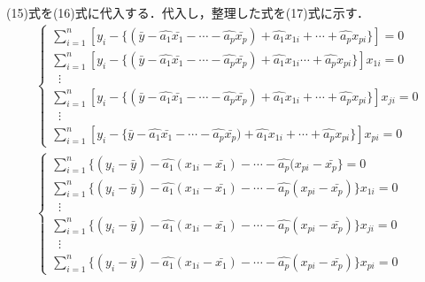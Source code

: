 \documentclass[dvipdfmx]{jsarticle}
\begin{document}
(15)式を(16)式に代入する．代入し，整理した式を(17)式に示す．
\begin{eqnarray}
  \begin{cases}
    \displaystyle
    \sum_{i=1}^n [y_i-\{(\bar{y}-\hat{a_1}\bar{x_1}-\cdots-\hat{a_p}\bar{x_p})+\hat{a_1}x_{1i}+\cdots+\hat{a_p}x_{pi}\}]=0       \\
    \displaystyle
    \sum_{i=1}^n [y_i-\{(\bar{y}-\hat{a_1}\bar{x_1}-\cdots-\hat{a_p}\bar{x_p})+\hat{a_1}x_{1i}\cdots+\hat{a_p}x_{pi}\}]x_{1i}=0  \\
    \; \; \vdots                                                                     \\
    \displaystyle
    \sum_{i=1}^n [y_i-\{(\bar{y}-\hat{a_1}\bar{x_1}-\cdots-\hat{a_p}\bar{x_p})+\hat{a_1}x_{1i}+\cdots+\hat{a_p}x_{pi}\}]x_{ji}=0 \\
    \; \; \vdots                                                                     \\
    \displaystyle
    \sum_{i=1}^n [y_i-\{\bar{y}-\hat{a_1}\bar{x_1}-\cdots-\hat{a_p}\bar{x_p})+\hat{a_1}x_{1i}+\cdots+\hat{a_p}x_{pi}\}]x_{pi}=0
  \end{cases}
  \nonumber
  \\
  \begin{cases}
    \displaystyle
    \sum_{i=1}^n \{ (y_i-\bar{y})-\hat{a_1}(x_{1i}-\bar{x_1})-\cdots-\hat{a_p}(x_{pi}-\bar{x_p}\}=0       \\
    \displaystyle
    \sum_{i=1}^n \{ (y_i-\bar{y})-\hat{a_1}(x_{1i}-\bar{x_1})-\cdots-\hat{a_p}(x_{pi}-\bar{x_p})\}x_{1i}=0 \\
    \; \; \vdots                                                                                           \\
    \displaystyle
    \sum_{i=1}^n \{ (y_i-\bar{y})-\hat{a_1}(x_{1i}-\bar{x_1})-\cdots-\hat{a_p}(x_{pi}-\bar{x_p})\}x_{ji}=0 \\
    \; \; \vdots                                                                                           \\
    \displaystyle
    \sum_{i=1}^n \{ (y_i-\bar{y})-\hat{a_1}(x_{1i}-\bar{x_1})-\cdots-\hat{a_p}(x_{pi}-\bar{x_p})\}x_{pi}=0
  \end{cases}
\end{eqnarray}
\end{document}
